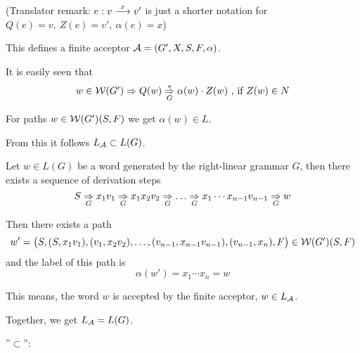 (Translator remark: $e: v \stackrel{x}{\longrightarrow} v'$ is just a shorter notation for $Q(e) =
v, \ Z(e) = v',\ \alpha(e) = x$)

This defines a finite acceptor $\mbox{$\mathcal{A}$} = (G', X, S, F, \alpha)$.

It is easily seen that
\[ w \in \mbox{$\mathcal{W}(G')$} \Rightarrow Q(w) \underset{G}{\overset{*}{\Rightarrow}} \alpha(w) \cdot Z(w) \mbox{
 , if } Z(w) \in N\]

For paths $w \in \mbox{$\mathcal{W}(G')$}(S, F)$ we get $\alpha(w) \in L$.

From this it follows $\mbox{$L_{\mathcal{A}}$} \subset L(G)$.

Let $w \in L(G)$ be a word generated by the right-linear grammar $G$, then there
exists a sequence of derivation steps
\[ S \underset{G}{\Rightarrow} x_1 v_1 \underset{G}{\Rightarrow} x_1 x_2 v_2 \underset{G}{\Rightarrow} \ldots
\underset{G}{\Rightarrow} x_1 \cdots x_{n-1} v_{n-1} \underset{G}{\Rightarrow} w \]

Then there exists a path 
\[ w' = \big(S, (S,x_1 v_1), (v_1, x_2 v_2), \ldots, (v_{n-1}, x_{n-1} v_{n-1}),
(v_{n-1}, x_n), F\big) \in \mbox{$\mathcal{W}(G')$}(S, F) \]
and the label of this path is
\[ \alpha(w') = x_1 \cdots x_n = w \]

This means, the word $w$ is accepted by the finite acceptor, $w \in \mbox{$L_{\mathcal{A}}$}$.

Together, we get $\mbox{$L_{\mathcal{A}}$} = L(G)$.

''$\subset$'':

























